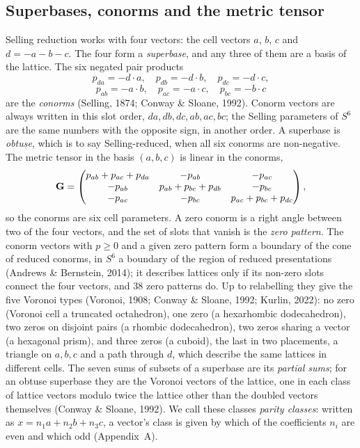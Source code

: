 \subsection{Superbases, conorms and the metric tensor}
\label{sec:defs}
Selling reduction works with four vectors: the cell vectors $a$, $b$, $c$ and $d=-a-b-c$. The four form a \emph{superbase}, and any three of them are a basis of the lattice. The six negated pair products
\[
p_{da}=-d\cdot a,\quad p_{db}=-d\cdot b,\quad p_{dc}=-d\cdot c,
\]
\[
p_{ab}=-a\cdot b,\quad p_{ac}=-a\cdot c,\quad p_{bc}=-b\cdot c
\]
are the \emph{conorms} (Selling, 1874; Conway \& Sloane, 1992). Conorm vectors are always written in this slot order, $da,db,dc,ab,ac,bc$; the Selling parameters of $S^6$ are the same numbers with the opposite sign, in another order. A superbase is \emph{obtuse}, which is to say Selling-reduced, when all six conorms are non-negative. The metric tensor in the basis $(a,b,c)$ is linear in the conorms,
\begin{equation}
\Gmet=\begin{pmatrix}
p_{ab}+p_{ac}+p_{da} & -p_{ab} & -p_{ac}\\
-p_{ab} & p_{ab}+p_{bc}+p_{db} & -p_{bc}\\
-p_{ac} & -p_{bc} & p_{ac}+p_{bc}+p_{dc}
\end{pmatrix},
\label{eq:gram}
\end{equation}
so the conorms are six cell parameters. A zero conorm is a right angle between two of the four vectors, and the set of slots that vanish is the \emph{zero pattern}. The conorm vectors with $p\ge0$ and a given zero pattern form a boundary of the cone of reduced conorms, in $S^6$ a boundary of the region of reduced presentations (Andrews \& Bernstein, 2014); it describes lattices only if its non-zero slots connect the four vectors, and 38 zero patterns do. Up to relabelling they give the five Voronoi types (Voronoi, 1908; Conway \& Sloane, 1992; Kurlin, 2022): no zero (Voronoi cell a truncated octahedron), one zero (a hexarhombic dodecahedron), two zeros on disjoint pairs (a rhombic dodecahedron), two zeros sharing a vector (a hexagonal prism), and three zeros (a cuboid), the last in two placements, a triangle on $a,b,c$ and a path through $d$, which describe the same lattices in different cells. The seven sums of subsets of a superbase are its \emph{partial sums}; for an obtuse superbase they are the Voronoi vectors of the lattice, one in each class of lattice vectors modulo twice the lattice other than the doubled vectors themselves (Conway \& Sloane, 1992). We call these classes \emph{parity classes}: written as $x=n_1a+n_2b+n_3c$, a vector's class is given by which of the coefficients $n_i$ are even and which odd (Appendix~A).

